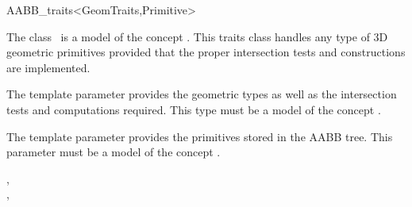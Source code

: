 \ccRefPageBegin


\begin{ccRefClass}{AABB_traits<GeomTraits,Primitive>}


\ccDefinition
  
The class \ccRefName\ is a model of the concept . This traits class handles any type of 3D geometric primitives provided that the proper intersection tests and constructions are implemented.

\ccParameters
The template parameter  provides the geometric types as well as the intersection tests and computations required. This type must be a model of the concept .

The template parameter  provides the primitives stored in the AABB tree. This parameter must be a model of the concept .


\ccTypes


\ccCreation
{} 

\ccSeeAlso

,\\
, \\
\\


\end{ccRefClass}

\ccRefPageEnd

